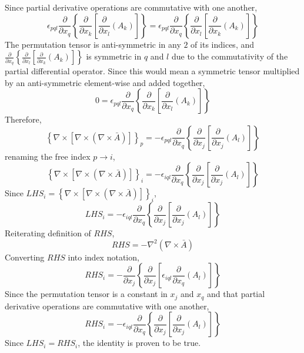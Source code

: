 \documentclass[class=report, 12pt, crop=false]{standalone}
\begin{document}
\begin{center}
Since partial derivative operations are commutative with one another,
$$\epsilon_{pql}\frac{\partial}{\partial x_{q}}\left\{\frac{\partial}{\partial x_{k}}\left[\frac{\partial}{\partial x_{l}}(A_{k})\right]\right\} = \epsilon_{pql}\frac{\partial}{\partial x_{q}}\left\{\frac{\partial}{\partial x_{l}}\left[\frac{\partial}{\partial x_{k}}(A_{k})\right]\right\}$$
The permutation tensor is anti-symmetric in any $2$ of its indices, and $\displaystyle \frac{\partial}{\partial x_{q}}\left\{\frac{\partial}{\partial x_{l}}\left[\frac{\partial}{\partial x_{k}}(A_{k})\right]\right\}$ is symmetric in $q$ and $l$ due to the commutativity of the partial differential operator. Since this would mean a symmetric tensor multiplied by an anti-symmetric element-wise and added together,
$$0 = \epsilon_{pql}\frac{\partial}{\partial x_{q}}\left\{\frac{\partial}{\partial x_{k}}\left[\frac{\partial}{\partial x_{l}}(A_{k})\right]\right\}$$
Therefore,
$$\left\{\nabla\times[\nabla\times(\nabla\times\bar{A})]\right\}_{p} =  -  \epsilon_{pql}\frac{\partial}{\partial x_{q}}\left\{\frac{\partial}{\partial x_{j}}\left[\frac{\partial}{\partial x_{j}}(A_{l})\right]\right\}$$
renaming the free index $p \to i$,
$$\left\{\nabla\times[\nabla\times(\nabla\times\bar{A})]\right\}_{i} =  -  \epsilon_{iql}\frac{\partial}{\partial x_{q}}\left\{\frac{\partial}{\partial x_{j}}\left[\frac{\partial}{\partial x_{j}}(A_{l})\right]\right\}$$
Since $LHS_{i} = \left\{\nabla\times[\nabla\times(\nabla\times\bar{A})]\right\}_{i}$,
$$LHS_{i} =  -  \epsilon_{iql}\frac{\partial}{\partial x_{q}}\left\{\frac{\partial}{\partial x_{j}}\left[\frac{\partial}{\partial x_{j}}(A_{l})\right]\right\}$$
Reiterating definition of $RHS$,
$$RHS = -\nabla^{2}(\nabla\times\bar{A})$$
Converting $RHS$ into index notation,
$$RHS_{i} = -\frac{\partial}{\partial x_{j}}\left\{\frac{\partial}{\partial x_{j}}\left[\epsilon_{iql}\frac{\partial}{\partial x_{q}}(A_{l})\right]\right\}$$
Since the permutation tensor is a constant in $x_{j}$ and $x_{q}$ and that partial derivative operations are commutative with one another,
$$RHS_{i} = -\epsilon_{iql}\frac{\partial}{\partial x_{q}}\left\{\frac{\partial}{\partial x_{j}}\left[\frac{\partial}{\partial x_{j}}(A_{l})\right]\right\}$$
Since $LHS_{i} = RHS_{i}$, the identity is proven to be true.
\end{center}
\end{document}
